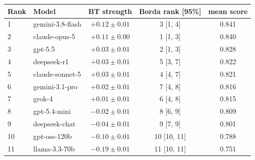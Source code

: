 \begin{tabular}{llccc}
\toprule
Rank & Model & BT strength & Borda rank [95\%] & mean score \\
\midrule
1 & gemini-3.8-flash & $+0.12 \pm 0.01$ & 3 [1, 4] & 0.841 \\
2 & claude-opus-5 & $+0.11 \pm 0.00$ & 1 [1, 3] & 0.840 \\
3 & gpt-5.5 & $+0.03 \pm 0.01$ & 2 [1, 3] & 0.828 \\
4 & deepseek-r1 & $+0.03 \pm 0.01$ & 5 [3, 7] & 0.822 \\
5 & claude-sonnet-5 & $+0.03 \pm 0.01$ & 4 [4, 7] & 0.821 \\
6 & gemini-3.1-pro & $+0.02 \pm 0.01$ & 7 [4, 8] & 0.816 \\
7 & grok-4 & $+0.01 \pm 0.01$ & 6 [4, 8] & 0.815 \\
8 & gpt-5.4-mini & $-0.02 \pm 0.01$ & 8 [6, 9] & 0.809 \\
9 & deepseek-chat & $-0.04 \pm 0.01$ & 9 [7, 9] & 0.801 \\
10 & gpt-oss-120b & $-0.10 \pm 0.01$ & 10 [10, 11] & 0.788 \\
11 & llama-3.3-70b & $-0.19 \pm 0.01$ & 11 [10, 11] & 0.751 \\
\bottomrule
\end{tabular}
